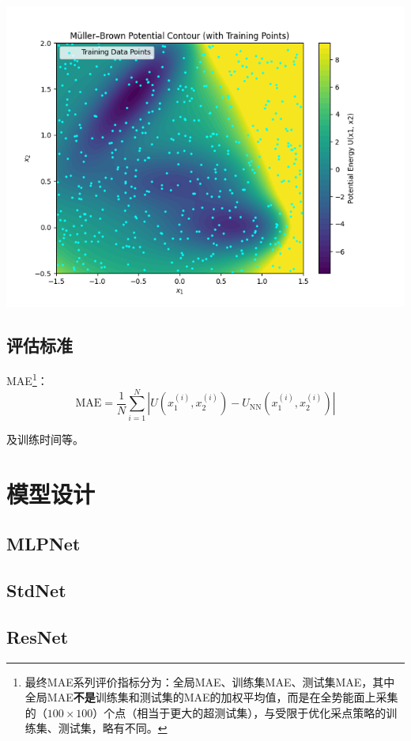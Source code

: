 \documentclass[11pt]{article}
\begin{document}
\begin{minipage}[t]{0.48\textwidth}
    \vspace{-\baselineskip}
    \centering
    \includegraphics[width=\linewidth]{potential_data.png}
    \label{fig:surface}
\end{minipage}
\subsection{评估标准}
MAE\footnote{最终MAE系列评价指标分为：全局MAE、训练集MAE、测试集MAE，其中全局MAE\textbf{不是}训练集和测试集的MAE的加权平均值，而是在全势能面上采集的（$100\times100$）个点（相当于更大的超测试集），与受限于优化采点策略的训练集、测试集，略有不同。}：
\[
    \text{MAE} = \frac{1}{N} \sum_{i=1}^N |U(x_1^{(i)}, x_2^{(i)}) - U_{\text{NN}}(x_1^{(i)}, x_2^{(i)})|
\]


及训练时间等。
\section{模型设计}
\subsection{MLPNet}
\subsection{StdNet}
\subsection{ResNet}
\end{document}
